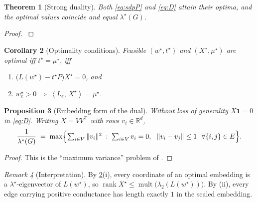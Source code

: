 \documentclass[11pt,a4paper]{article}
\newif\ifdraftnotes
\newcommand{\todo}[1]{\ifdraftnotes{\color{red!70!black}\sffamily[TODO: #1]}\fi}
\theoremstyle{plain}
\newtheorem{theorem}{Theorem}[section]
\newtheorem{proposition}[theorem]{Proposition}
\newtheorem{corollary}[theorem]{Corollary}
\theoremstyle{definition}
\theoremstyle{remark}
\newtheorem{remark}[theorem]{Remark}
\newcommand{\R}{\mathbb{R}}
\newcommand{\one}{\mathbf{1}}
\newcommand{\ip}[2]{\left\langle #1,\, #2 \right\rangle}
\newcommand{\Lad}{\mathcal{L}}            %
\newcommand{\opt}{\lambda^{\star}}        %
\DeclareMathOperator{\rank}{rank}
\DeclareMathOperator{\mult}{mult}
\begin{document}
	\begin{theorem}[Strong duality]\label{thm:strong}
		Both \eqref{eq:sdpP} and \eqref{eq:D} attain their optima, and the optimal
		values coincide and equal $\opt(G)$.
	\end{theorem}
	\begin{proof}
		\todo{Slater: $w=\one/m$ with $t<\lambda_2(L(\one/m))$ is strictly
			feasible for the primal; $X=P/(N-1)$ with large $\mu$ for the dual.}
		\cite{VandenbergheBoyd1996,BoydVandenberghe2004}
	\end{proof}
	
	\begin{corollary}[Optimality conditions]\label{cor:kkt}
		Feasible $(w^\star,t^\star)$ and $(X^\star,\mu^\star)$ are optimal iff
		$t^\star=\mu^\star$, iff
		\begin{enumerate}[label=(\roman*)]
			\item $\bigl(L(w^\star)-t^\star P\bigr)X^\star=0$, and
			\item $w^\star_e>0\ \Rightarrow\ \ip{L_e}{X^\star}=\mu^\star$.
		\end{enumerate}
	\end{corollary}
	
	\begin{proposition}[Embedding form of the dual]\label{prop:embedding}
		Without loss of generality $X\one=0$ in \eqref{eq:D}. Writing
		$X=VV^\top$ with rows $v_i\in\R^d$,
		\[
		\frac{1}{\opt(G)} \;=\; \max\Bigl\{\textstyle\sum_{i\in V}\|v_i\|^2 \;:\;
		\sum_{i\in V} v_i=0,\ \ \|v_i-v_j\|\le1\ \ \forall\{i,j\}\in E\Bigr\}.
		\]
	\end{proposition}
	\begin{proof}
		\todo{Replace $X$ by $PXP$ (objective and constraints unchanged since
			$L_eP=L_e$); then $\ip{L_e}{X}=\|v_i-v_j\|^2$ and
			$\ip{P}{X}=\sum_i\|v_i\|^2$; rescale.} This is the ``maximum variance''
		problem of \cite{SunBoydXiaoDiaconis2006,GoeringHelmbergWappler2008}.
	\end{proof}
	
	\begin{remark}[Interpretation]
		By \cref{cor:kkt}(i), every coordinate of an optimal embedding is a
		$\opt$-eigenvector of $L(w^\star)$, so
		$\rank X^\star\le\mult\bigl(\lambda_2(L(w^\star))\bigr)$. By (ii), every
		edge carrying positive conductance has length exactly $1$ in the scaled
		embedding. \todo{Check \cite{GoeringHelmbergWappler2011} for a bound on
			the embedding dimension in terms of tree-width; $\Lad_n$ has tree-width 2.}
	\end{remark}
	
\end{document}
